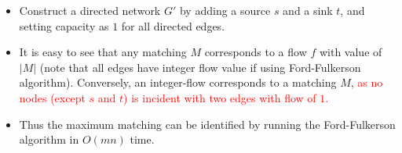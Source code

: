 \documentclass[mathserif]{beamer}
\begin{document}
{\begin{figure}
\end{figure}

\begin{itemize}
	\item Construct a directed network $G'$ by adding a source $s$ and a sink $t$, and setting capacity as $1$ for all directed edges.
	
	\item It is easy to see that any matching $M$ corresponds to a flow $f$ with value of $|M|$ (note that all edges have integer flow value if using Ford-Fulkerson algorithm). Conversely, an integer-flow corresponds to a matching $M$, \textcolor{red}{as no nodes (except $s$ and $t$) is incident with two edges with flow of $1$.}  
	\item Thus the maximum matching can be identified by running the Ford-Fulkerson algorithm in $O(m n)$ time. 
\end{itemize}
}
\end{document}
